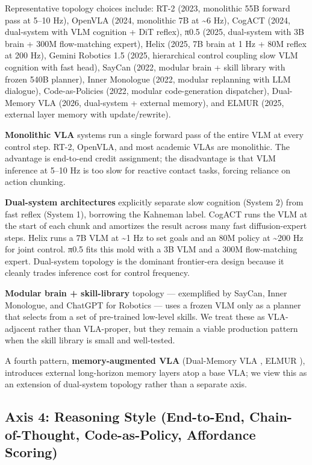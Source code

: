 \documentclass{article}
\begin{document}
Representative topology choices include: RT-2 (2023, monolithic 55B forward pass at 5--10 Hz), OpenVLA (2024, monolithic 7B at \textasciitilde6 Hz), CogACT (2024, dual-system with VLM cognition + DiT reflex), π0.5 (2025, dual-system with 3B brain + 300M flow-matching expert), Helix (2025, 7B brain at 1 Hz + 80M reflex at 200 Hz), Gemini Robotics 1.5 (2025, hierarchical control coupling slow VLM cognition with fast head), SayCan (2022, modular brain + skill library with frozen 540B planner), Inner Monologue (2022, modular replanning with LLM dialogue), Code-as-Policies (2022, modular code-generation dispatcher), Dual-Memory VLA (2026, dual-system + external memory), and ELMUR (2025, external layer memory with update/rewrite).

\textbf{Monolithic VLA} systems run a single forward pass of the entire VLM at every control step. RT-2, OpenVLA, and most academic VLAs are monolithic. The advantage is end-to-end credit assignment; the disadvantage is that VLM inference at 5--10 Hz is too slow for reactive contact tasks, forcing reliance on action chunking.

\textbf{Dual-system architectures} explicitly separate slow cognition (System 2) from fast reflex (System 1), borrowing the Kahneman label. CogACT runs the VLM at the start of each chunk and amortizes the result across many fast diffusion-expert steps. Helix runs a 7B VLM at \textasciitilde1 Hz to set goals and an 80M policy at \textasciitilde200 Hz for joint control. π0.5 fits this mold with a 3B VLM and a 300M flow-matching expert. Dual-system topology is the dominant frontier-era design because it cleanly trades inference cost for control frequency.

\textbf{Modular brain + skill-library} topology --- exemplified by SayCan, Inner Monologue, and ChatGPT for Robotics --- uses a frozen VLM only as a planner that selects from a set of pre-trained low-level skills. We treat these as VLA-adjacent rather than VLA-proper, but they remain a viable production pattern when the skill library is small and well-tested.

A fourth pattern, \textbf{memory-augmented VLA} (Dual-Memory VLA \cite{li2026globalpriormeetslo}, ELMUR \cite{cherepanov2025elmurexternallayer}), introduces external long-horizon memory layers atop a base VLA; we view this as an extension of dual-system topology rather than a separate axis.

\subsection{Axis 4: Reasoning Style (End-to-End, Chain-of-Thought, Code-as-Policy, Affordance Scoring)}\label{axis-4-reasoning-style-end-to-end-chain-of-thought-code-as-policy-affordance-scoring}
\end{document}
